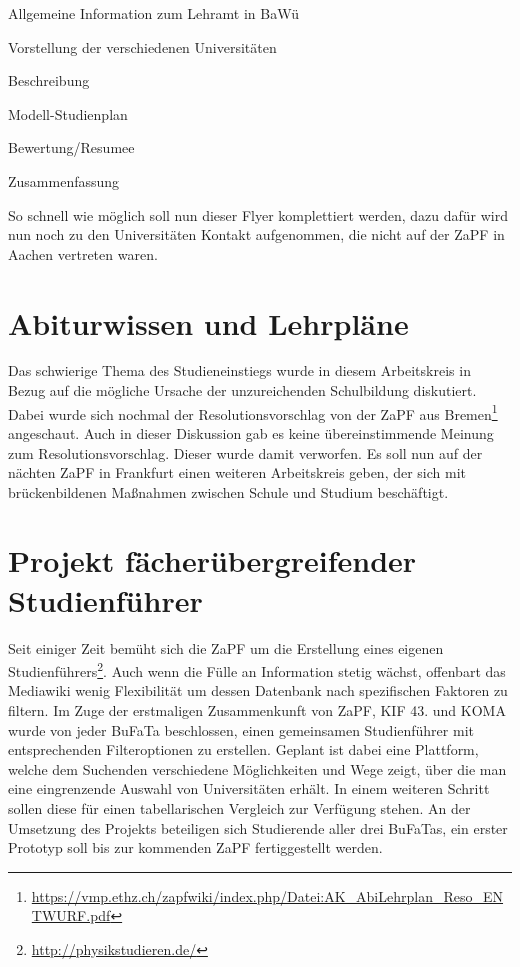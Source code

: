 \documentclass{scrartcl}
\begin{document}
\begin{compactenum}
	\item Allgemeine Information zum Lehramt in BaWü
	\item Vorstellung der verschiedenen Universitäten
		\begin{compactenum}
		\item Beschreibung
		\item Modell-Studienplan
		\item Bewertung/Resumee
		\end{compactenum}
	\item Zusammenfassung
\end{compactenum}

So schnell wie möglich soll nun dieser Flyer komplettiert werden, dazu dafür
wird nun noch zu den Universitäten Kontakt aufgenommen, die nicht auf der
ZaPF in Aachen vertreten waren.

\section*{Abiturwissen und Lehrpläne}

Das schwierige Thema des Studieneinstiegs wurde in diesem Arbeitskreis in Bezug
auf die mögliche Ursache der unzureichenden Schulbildung diskutiert.  Dabei
wurde sich nochmal der Resolutionsvorschlag von der ZaPF aus Bremen\footnote{\href{https://vmp.ethz.ch/zapfwiki/index.php/Datei:AK_AbiLehrplan_Reso_ENTWURF.pdf}{\url{https://vmp.ethz.ch/zapfwiki/index.php/Datei:AK_AbiLehrplan_Reso_ENTWURF.pdf}}}
angeschaut. Auch in dieser Diskussion gab es keine übereinstimmende Meinung zum
Resolutionsvorschlag. Dieser wurde damit verworfen.  Es soll nun auf der
nächten ZaPF in Frankfurt einen weiteren Arbeitskreis geben, der sich mit
brückenbildenen Maßnahmen zwischen Schule und Studium beschäftigt.


\section*{Projekt fächerübergreifender Studienführer }

Seit einiger Zeit bemüht sich die ZaPF um die Erstellung eines eigenen
Studienführers\footnote{\href{http://physikstudieren.de/}{\url{http://physikstudieren.de/}}}.
Auch wenn die Fülle an Information stetig wächst, offenbart das Mediawiki wenig
Flexibilität um dessen Datenbank nach spezifischen Faktoren zu filtern.  Im
Zuge der erstmaligen Zusammenkunft von ZaPF, KIF 43. und KOMA wurde von jeder
BuFaTa beschlossen, einen gemeinsamen Studienführer mit entsprechenden
Filteroptionen zu erstellen. Geplant ist dabei eine Plattform, welche dem
Suchenden verschiedene Möglichkeiten und Wege zeigt, über die man eine
eingrenzende Auswahl von Universitäten erhält. In einem weiteren Schritt sollen
diese für einen tabellarischen Vergleich zur Verfügung stehen.  An der
Umsetzung des Projekts beteiligen sich Studierende aller drei BuFaTas, ein
erster Prototyp soll bis zur kommenden ZaPF fertiggestellt werden.
\end{document}
